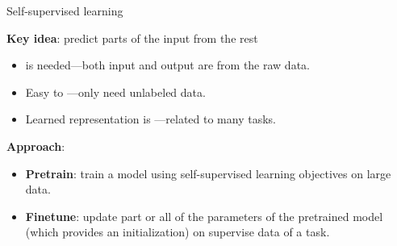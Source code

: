 \documentclass[usenames,dvipsnames,notes,11pt,aspectratio=169,hyperref={colorlinks=true, linkcolor=blue}]{beamer}
\begin{document}
\begin{frame}
    {Self-supervised learning}

    \textbf{Key idea}: predict parts of the input from the rest\\
    \begin{itemize}
        \item {} is needed---both input and output are from the raw data.
        \item Easy to ---only need unlabeled data.
        \item Learned representation is ---related to many tasks.
    \end{itemize}

    \pause
    \textbf{Approach}:\\
    \begin{itemize}
        \item \textbf{Pretrain}: train a model using self-supervised learning objectives on large data.
        \item \textbf{Finetune}: update part or all of the parameters of the pretrained model (which provides an initialization) on supervise data of a task.
    \end{itemize}
\end{frame}
\end{document}
